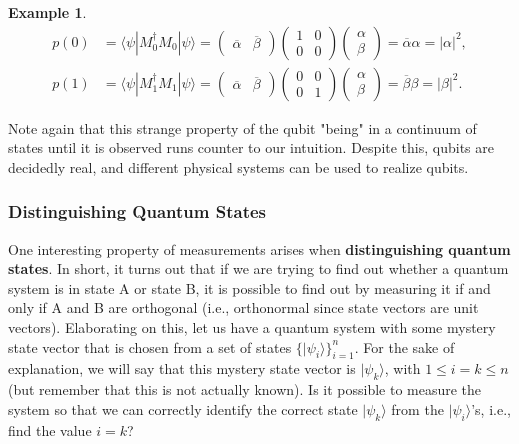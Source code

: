 \documentclass{article}
\theoremstyle{definition}
\newtheorem{example}{Example}[section]
\begin{document}
\begin{example}
        \begin{align*}
          p(0) & = \langle \psi | M_0^\dagger M_0 | \psi \rangle = \begin{pmatrix} \overline{\alpha} & \overline{\beta} \end{pmatrix} \begin{pmatrix} 1 & 0 \\ 0&0 \end{pmatrix} \begin{pmatrix} \alpha \\ \beta \end{pmatrix} = \overline{\alpha} \alpha = |\alpha|^2, \\
          p(1) & = \langle \psi | M_1^\dagger M_1 | \psi \rangle = \begin{pmatrix} \overline{\alpha} & \overline{\beta} \end{pmatrix} \begin{pmatrix} 0 & 0 \\ 0&1 \end{pmatrix} \begin{pmatrix} \alpha \\ \beta \end{pmatrix} = \overline{\beta} \beta = |\beta|^2.
        \end{align*}

        Note again that this strange property of the qubit "being" in a continuum of states until it is observed runs counter to our intuition. Despite this, qubits are decidedly real, and different physical systems can be used to realize qubits.
      \end{example}

    \subsubsection{Distinguishing Quantum States}

      One interesting property of measurements arises when \textbf{distinguishing quantum states}. In short, it turns out that if we are trying to find out whether a quantum system is in state A or state B, it is possible to find out by measuring it if and only if A and B are orthogonal (i.e., orthonormal since state vectors are unit vectors). Elaborating on this, let us have a quantum system with some mystery state vector that is chosen from a set of states $\{|\psi_i \rangle \}_{i=1}^n$. For the sake of explanation, we will say that this mystery state vector is $|\psi_k \rangle$, with $1 \leq i = k \leq n$ (but remember that this is not actually known). Is it possible to measure the system so that we can correctly identify the correct state $|\psi_k \rangle$ from the $|\psi_i\rangle$'s, i.e., find the value $i=k$?
\end{document}

